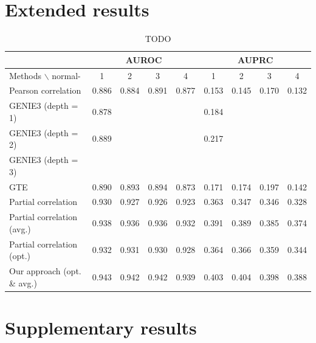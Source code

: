 \documentclass[wcp]{jmlr}
\begin{document}


\section{Extended results}

\begin{table}
\small
\centering
\begin{tabular}{@{}l *{8}{c}@{}}
  & \multicolumn{4}{c}{AUROC} & \multicolumn{4}{c}{AUPRC} \\
\hline \hline
Methods $\backslash$ normal- & 1 & 2 & 3 & 4 & 1 & 2 & 3 & 4 \\
\hline \hline
Pearson correlation    & 0.886 & 0.884 & 0.891 & 0.877 & 0.153 & 0.145 & 0.170 & 0.132 \\
GENIE3 (depth = 1)     & 0.878 & & & & 0.184 & & & \\
GENIE3 (depth = 2)     & 0.889 & & & & 0.217 & & & \\
GENIE3 (depth = 3)     & & & & & & & & \\
GTE                    & 0.890 & 0.893 & 0.894 & 0.873 & 0.171 & 0.174 & 0.197 & 0.142 \\
Partial correlation    & 0.930 &  0.927 &  0.926 &  0.923& 0.363  & 0.347 &  0.346 & 0.328 \\
Partial correlation (avg.) & 0.938 & 0.936 & 0.936 & 0.932& 0.391 & 0.389 & 0.385 & 0.374\\
Partial correlation (opt.) & 0.932 & 0.931 & 0.930 & 0.928 & 0.364 & 0.366 & 0.359 & 0.344 \\
Our approach (opt. \& avg.)    & 0.943 & 0.942 & 0.942 & 0.939 & 0.403 & 0.404 & 0.398 & 0.388 \\
\end{tabular}
\caption{TODO}
\label{tab:tab1}
\end{table}


\section{Supplementary results}
\end{document}
